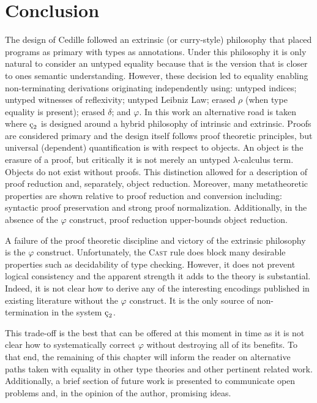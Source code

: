 \chapter{Conclusion}

The design of Cedille followed an extrinsic (or curry-style) philosophy that placed programs as primary with types as annotations.
Under this philosophy it is only natural to consider an untyped equality because that is the version that is closer to ones semantic understanding.
However, these decision led to equality enabling non-terminating derivations originating independently using: untyped indices; untyped witnesses of reflexivity; untyped Leibniz Law; erased $\rho$ (when type equality is present); erased $\delta$; and $\varphi$.
In this work an alternative road is taken where $\ced$ is designed around a hybrid philosophy of intrinsic and extrinsic.
Proofs are considered primary and the design itself follows proof theoretic principles, but universal (dependent) quantification is with respect to objects.
An object is the erasure of a proof, but critically it is not merely an untyped $\lambda$-calculus term.
Objects do not exist without proofs.
This distinction allowed for a description of proof reduction and, separately, object reduction.
Moreover, many metatheoretic properties are shown relative to proof reduction and conversion including: syntactic proof preservation and strong proof normalization.
Additionally, in the absence of the $\varphi$ construct, proof reduction upper-bounds object reduction.

A failure of the proof theoretic discipline and victory of the extrinsic philosophy is the $\varphi$ construct.
Unfortunately, the \textsc{Cast} rule does block many desirable properties such as decidability of type checking.
However, it does not prevent logical consistency and the apparent strength it adds to the theory is substantial.
Indeed, it is not clear how to derive any of the interesting encodings published in existing literature without the $\varphi$ construct.
It is the only source of non-termination in the system $\ced$.

This trade-off is the best that can be offered at this moment in time as it is not clear how to systematically correct $\varphi$ without destroying all of its benefits.
To that end, the remaining of this chapter will inform the reader on alternative paths taken with equality in other type theories and other pertinent related work.
Additionally, a brief section of future work is presented to communicate open problems and, in the opinion of the author, promising ideas.

